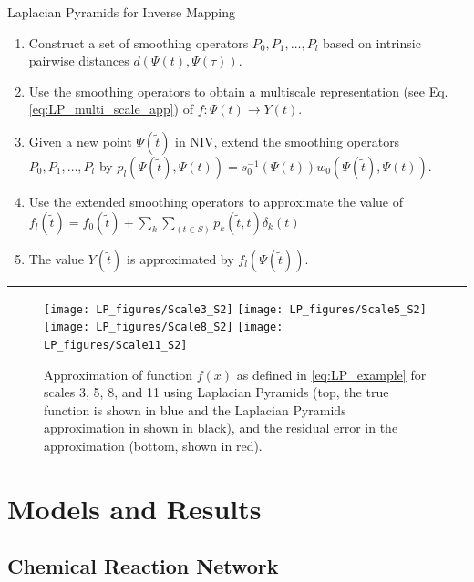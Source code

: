 \documentclass[aip,jcp,reprint,twocolumn]{revtex4-1}
\begin{document}
\begin{algorithm}[th!]
\caption{Laplacian Pyramids for Inverse Mapping}
\begin{enumerate}

\item
Construct a set of smoothing operators $P_0, P_1, \ldots, P_l$  based on intrinsic pairwise distances $d(\Psi(t),\Psi(\tau))$.


\item
Use the smoothing operators to obtain a multiscale representation (see Eq. \ref{eq:LP_multi_scale_app}) of $f:\Psi(t) \rightarrow Y(t)$.

\item Given a new point $\Psi(\tilde{t})$ in NIV, extend the smoothing operators $P_0, P_1, \ldots, P_l$  by
$p_l(\Psi(\tilde{t}), \Psi(t)) = s_0^{-1}(\Psi(t))w_0(\Psi(\tilde{t}),\Psi(t))$.

\item
Use the extended smoothing operators to approximate the value of $f_l(\tilde{t}) = f_0(\tilde{t}) + \sum_{k}\sum_{(t \in S)}p_k(\tilde{t}, t)\delta_k(t)$


\item
The value $Y(\tilde{t})$ is approximated by $f_l(\Psi(\tilde{t}))$.

\end{enumerate}
\hrule
\label{algo_LP}
\end{algorithm}


\begin{figure}[ht]
\texttt{[image: LP\_figures/Scale3\_S2]}
\texttt{[image: LP\_figures/Scale5\_S2]}
\texttt{[image: LP\_figures/Scale8\_S2]}
\texttt{[image: LP\_figures/Scale11\_S2]}
\caption{Approximation of function $f(x)$ as defined in \eqref{eq:LP_example} for scales 3, 5, 8, and 11 using Laplacian Pyramids (top, the true function is shown in blue and the Laplacian Pyramids approximation in shown in black), and the residual error in the approximation (bottom, shown in red).}
\label{fig:LP_ex}
\end{figure}

\section{Models and Results} \label{sec:examples}

\subsection{Chemical Reaction Network}
\end{document}
